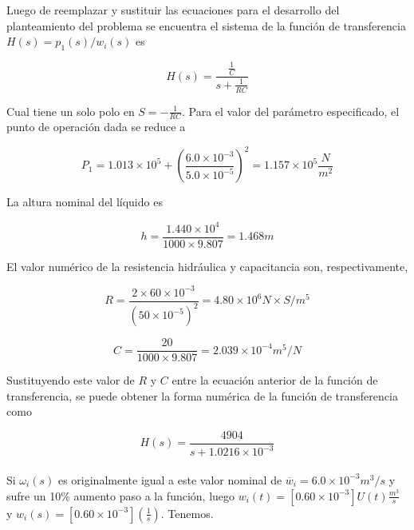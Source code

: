 \documentclass[a4paper,12pt,twoside]{proyectotanquesecci}
\begin{document}
Luego de reemplazar y sustituir las ecuaciones para el desarrollo del planteamiento del problema se encuentra el sistema de la función de transferencia $H\left( s\right) =p_{1}\left( s\right) /w_{i}\left( s\right)$ es

\begin{equation}
H\left( s\right) =\frac {\frac {1}{C}}{s+\frac {1}{RC}}
\end{equation}

Cual tiene un solo polo en $S=-\frac{1}{RC}$. Para el valor del parámetro especificado, el punto de operación dada se reduce a

\begin{equation}
P_{1}=1.013\times 10^{5}+\left( \frac {6.0\times 10^{-3}}{5.0\times 10^{-5}}\right) ^{2}=1.157\times 10^{5}\frac {N}{m^{2}}
\end{equation}

La altura nominal del líquido es

\begin{equation}
h=\frac {1.440\times 10^{4}}{1000\times 9.807}=1.468m
\end{equation}

El valor numérico de la resistencia hidráulica y capacitancia son, respectivamente,

\begin{equation}
R=\frac {2\times 60\times 10^{-3}}{\left( 50\times 10^{-5}\right) ^{2}}=4.80\times 10^{6}N\times S/m^{5}
\end{equation}

\begin{equation}
C=\frac {20}{1000\times 9.807}=2.039\times 10^{-4}m^{5}/N
\end{equation}

Sustituyendo este valor de $R$ y $C$ entre la ecuación anterior de la función de transferencia, se puede obtener la forma numérica  de la función de transferencia como

\begin{equation}
H\left( s\right) =\frac {4904}{s+1.0216\times 10^{-3}}
\end{equation} \\

Si $\omega_{i}(s)$ es originalmente igual a este valor nominal de $\overline {w}_{i}=6.0\times 10^{-3}m^{3}/s$ y sufre un 10\% aumento paso a la función, luego $w_{i}\left( t\right) =\left[ 0.60\times 10^{-3}\right] U\left( t\right) \frac {m^{3}}{s}$ y $w_{i}\left( s\right) =\left[ 0.60\times 10^{-3}\right] \left( \frac {1}{s}\right)$. Tenemos.
\end{document}
